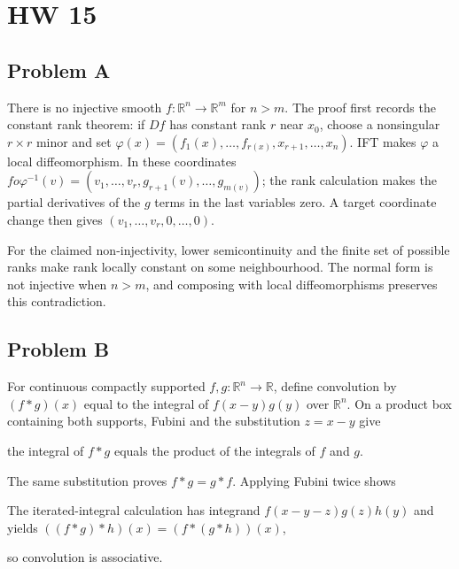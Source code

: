 \chapter{HW 15}

\section{Problem A}

There is no injective smooth \(f:\mathbb{R}^{n}\rightarrow\mathbb{R}^{m}\) for \(n > m\). The proof first records the constant rank theorem: if \(Df\) has constant rank \(r\) near \(x_{0}\), choose a nonsingular \(r \times r\) minor and set \(\varphi(x) = \left( {f_{1}(x),\ldots,f_{r{(x)}},x_{r + 1},\ldots,x_{n}} \right)\). IFT makes \(\varphi\) a local diffeomorphism. In these coordinates \(fo\varphi^{- 1}(v) = \left( {v_{1},\ldots,v_{r},g_{r + 1}(v),\ldots,g_{m{(v)}}} \right)\); the rank calculation makes the partial derivatives of the \(g\) terms in the last variables zero. A target coordinate change then gives \(\left( {v_{1},\ldots,v_{r},0,\ldots,0} \right)\).

For the claimed non-injectivity, lower semicontinuity and the finite set of possible ranks make rank locally constant on some neighbourhood. The normal form is not injective when \(n > m\), and composing with local diffeomorphisms preserves this contradiction.

\section{Problem B}

For continuous compactly supported \(f,g:\mathbb{R}^{n}\rightarrow\mathbb{R}\), define convolution by \(\left( {f \ast g} \right)(x)\) equal to the integral of \(f\left( {x - y} \right)g(y)\) over \(\mathbb{R}^{n}\). On a product box containing both supports, Fubini and the substitution \(z = x - y\) give

the integral of \(f \ast g\) equals the product of the integrals of \(f\) and \(g\).

The same substitution proves \(f \ast g = g \ast f\). Applying Fubini twice shows

The iterated-integral calculation has integrand \(f\left( {x - y - z} \right)g(z)h(y)\) and yields \(\left( {\left( {f \ast g} \right) \ast h} \right)(x) = \left( {f \ast \left( {g \ast h} \right)} \right)(x)\),

so convolution is associative.

